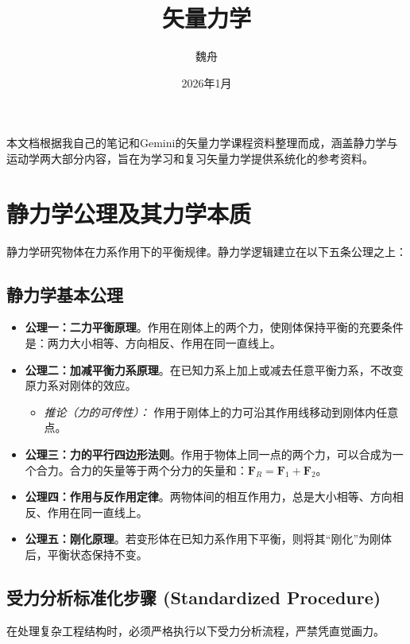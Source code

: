 \documentclass[12pt,a4paper]{article}
\title{\textbf{矢量力学}}
\author{魏舟}
\date{2026年1月}
\newcommand{\vect}[1]{\mathbf{#1}}                   %
\begin{document}
\maketitle
本文档根据我自己的笔记和Gemini的矢量力学课程资料整理而成，涵盖静力学与运动学两大部分内容，旨在为学习和复习矢量力学提供系统化的参考资料。
\newpage

\tableofcontents

\newpage
\section{静力学公理及其力学本质}

静力学研究物体在力系作用下的平衡规律。静力学逻辑建立在以下五条公理之上：

\subsection{静力学基本公理}
\begin{itemize}[leftmargin=2em]
    \item \textbf{公理一：二力平衡原理}。作用在刚体上的两个力，使刚体保持平衡的充要条件是：两力大小相等、方向相反、作用在同一直线上。
    \item \textbf{公理二：加减平衡力系原理}。在已知力系上加上或减去任意平衡力系，不改变原力系对刚体的效应。
    \begin{itemize}
        \item \textit{推论（力的可传性）：} 作用于刚体上的力可沿其作用线移动到刚体内任意点。
    \end{itemize}
    \item \textbf{公理三：力的平行四边形法则}。作用于物体上同一点的两个力，可以合成为一个合力。合力的矢量等于两个分力的矢量和：$\vect{F}_R = \vect{F}_1 + \vect{F}_2$。
    \item \textbf{公理四：作用与反作用定律}。两物体间的相互作用力，总是大小相等、方向相反、作用在同一直线上。
    \item \textbf{公理五：刚化原理}。若变形体在已知力系作用下平衡，则将其“刚化”为刚体后，平衡状态保持不变。
\end{itemize}

\subsection{受力分析标准化步骤 (Standardized Procedure)}
在处理复杂工程结构时，必须严格执行以下受力分析流程，严禁凭直觉画力。
\end{document}
